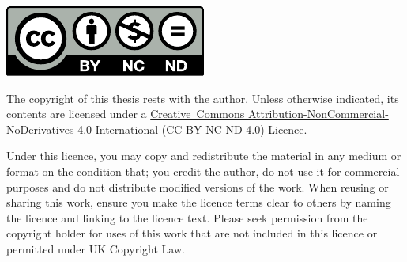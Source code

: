 \noindent
\begin{minipage}[b]{0.3275\textwidth}
    \noindent \raggedright \includegraphics[width=\linewidth]{chapters/backmatter/doclicense-CC-by-nc-nd.pdf}
\end{minipage}
\hfill
\hspace*{0.0225\textwidth}
\begin{minipage}[b]{0.65\textwidth}
    The    copyright    of    this     thesis    rests    with    the    author.
    Unless   otherwise    indicated,   its    contents   are    licensed   under
    a   \href{https://creativecommons.org/licenses/by-nc-nd/4.0/}{\mbox{Creative
    Commons}   Attribution-NonCommercial-NoDerivatives  4.0   International  (CC
    BY-NC-ND 4.0) Licence}.
\end{minipage}

\noindent Under this licence, you may  copy and redistribute the material in any
medium or format on the condition that; you credit the author, do not use it for
commercial purposes  and do not distribute  modified versions of the  work. When
reusing or sharing this work, ensure you  make the licence terms clear to others
by naming  the licence and linking  to the licence text.  Please seek permission
from the copyright  holder for uses of  this work that are not  included in this
licence or permitted under UK Copyright Law.

\vfill

